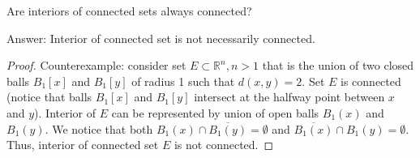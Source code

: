 \documentclass{article}
\begin{document}
\begin{tcolorbox}
Are interiors of connected sets always connected?
\end{tcolorbox}

Answer: Interior of connected set is not necessarily connected.

\begin{proof}
Counterexample: consider set $E \subset \mathbb{R}^n, n > 1$ that is the union of two closed balls $B_1[x]$ and $B_1[y]$ of radius 1 such that $d(x, y) = 2$. Set $E$ is connected (notice that balls $B_1[x]$ and $B_1[y]$ intersect at the halfway point between $x$ and $y$). Interior of $E$ can be represented by union of open balls $B_1(x)$ and $B_1(y)$. We notice that both $B_1(x) \cap \overline{B_1(y)} = \emptyset$ and $\overline{B_1(x)} \cap B_1(y) = \emptyset$. Thus, interior of connected set $E$ is not connected.
\end{proof}
\end{document}
